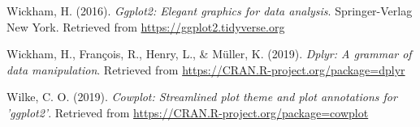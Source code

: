 \documentclass[english,,man,floatsintext]{apa6}
\begin{document}
\leavevmode\hypertarget{ref-r_wickham_ggplot2_2016}{}%
Wickham, H. (2016). \emph{Ggplot2: Elegant graphics for data analysis}. Springer-Verlag New York. Retrieved from \url{https://ggplot2.tidyverse.org}

\leavevmode\hypertarget{ref-r_wickham_dplyr_2019}{}%
Wickham, H., François, R., Henry, L., \& Müller, K. (2019). \emph{Dplyr: A grammar of data manipulation}. Retrieved from \url{https://CRAN.R-project.org/package=dplyr}

\leavevmode\hypertarget{ref-r_cowplot_2019}{}%
Wilke, C. O. (2019). \emph{Cowplot: Streamlined plot theme and plot annotations for 'ggplot2'}. Retrieved from \url{https://CRAN.R-project.org/package=cowplot}

\endgroup
\end{document}
